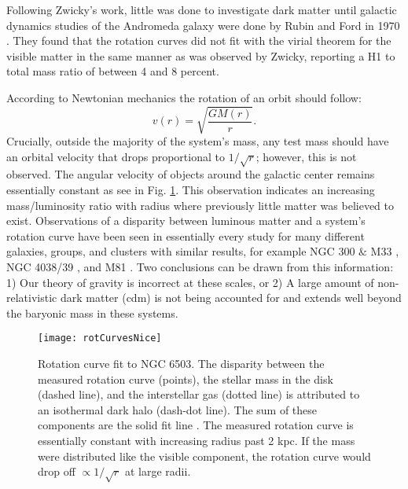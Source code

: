 Following Zwicky's work, little was done to investigate dark matter until galactic dynamics studies of the Andromeda galaxy were done by Rubin and Ford in 1970 \cite{rubinFormM31Curves1970}. They found that the rotation curves did not fit with the virial theorem for the visible matter in the same manner as was observed by Zwicky, reporting a H1 to total mass ratio of between 4 and 8 percent. 


According to Newtonian mechanics the rotation of an orbit should follow:
\begin{equation}
v(r) = \sqrt{\frac{GM(r)}{r}}.
\label{Eq:keplar}
\end{equation}
Crucially, outside the majority of the system's mass, any test mass should have an orbital velocity that drops proportional to $1/\sqrt{r}$; however, this is not observed. The angular velocity of objects around the galactic center remains essentially constant as see in Fig. \ref{Fig:galaxyDispersions}. This observation indicates an increasing mass/luminosity ratio with radius \cite{robertsAndRotsRotationM31M101M81} where previously little matter was believed to exist. Observations of a disparity between luminous matter and a system's rotation curve have been seen in essentially every study for many different galaxies, groups, and clusters with similar results, for example NGC 300 $\&$ M33 \cite{FreemanDisksOfSpiralsAndSos}, NGC 4038/39 \cite{RubinVelCurvesNGC4038and39}, and M81 \cite{robertsAndRotsRotationM31M101M81}. Two conclusions can be drawn from this information: 1) Our theory of gravity is incorrect at these scales, or 2) A large amount of non-relativistic dark matter (\gls{cdm}) is not being accounted for and extends well beyond the baryonic mass in these systems.

\begin{figure}[ht]
\centering
\texttt{[image: rotCurvesNice]}
\caption{Rotation curve fit to NGC 6503. The disparity between the measured rotation curve (points), the stellar mass in the disk (dashed line), and the interstellar gas (dotted line) is attributed to an isothermal dark halo (dash-dot line). The sum of these components are the solid fit line \cite{RotationCurvesBegeman1991}. The measured rotation curve is essentially constant with increasing radius past 2 kpc. If the mass were distributed like the visible component, the rotation curve would drop off $\propto 1/\sqrt{r}$ at large radii.}
\label{Fig:galaxyDispersions}
\end{figure}

\clearpage
